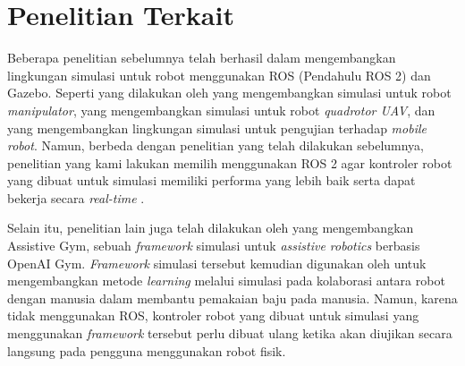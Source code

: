 \section{Penelitian Terkait}
\label{sec:penelitianterkait}

Beberapa penelitian sebelumnya telah berhasil dalam mengembangkan lingkungan simulasi untuk robot menggunakan ROS (Pendahulu ROS 2) dan Gazebo.
Seperti yang dilakukan oleh \citet{cit:qian2014} yang mengembangkan simulasi untuk robot \emph{manipulator},
  \citet{cit:zhang2015} yang mengembangkan simulasi untuk robot \emph{quadrotor UAV},
  dan \citet{cit:takaya2016} yang mengembangkan lingkungan simulasi untuk pengujian terhadap \emph{mobile robot}.
Namun,
  berbeda dengan penelitian yang telah dilakukan sebelumnya,
  penelitian yang kami lakukan memilih menggunakan ROS 2 agar kontroler robot yang dibuat untuk simulasi memiliki performa yang lebih baik serta dapat bekerja secara \emph{real-time} \citep{cit:maruyama2016}.

Selain itu,
  penelitian lain juga telah dilakukan oleh \citet{cit:erickson2020} yang mengembangkan Assistive Gym,
  sebuah \emph{framework} simulasi untuk \emph{assistive robotics} berbasis OpenAI Gym.
\emph{Framework} simulasi tersebut kemudian digunakan oleh \citet{cit:clegg2020} untuk mengembangkan metode \emph{learning} melalui simulasi pada kolaborasi antara robot dengan manusia dalam membantu pemakaian baju pada manusia.
Namun,
  karena tidak menggunakan ROS,
  kontroler robot yang dibuat untuk simulasi yang menggunakan \emph{framework} tersebut perlu dibuat ulang ketika akan diujikan secara langsung pada pengguna menggunakan robot fisik.
